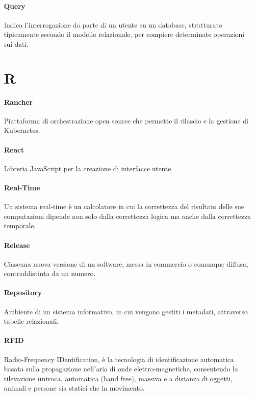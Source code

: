 \documentclass[]{article}
\begin{document}
	\paragraph*{Query}
	Indica l'interrogazione da parte di un utente su un database, strutturato tipicamente secondo il modello relazionale, per compiere determinate operazioni sui dati.
	
	\newpage
	
	\section*{R}
	
	\paragraph*{Rancher}
	Piattaforma di orchestrazione open source che permette il rilascio e la gestione di Kubernetes.
	
	\paragraph*{React}
	Libreria JavaScript per la creazione di interfacce utente.
	
	\paragraph*{Real-Time}
	Un sistema real-time è un calcolatore in cui la correttezza del risultato delle sue computazioni dipende non solo dalla correttezza logica ma anche dalla correttezza temporale.
	
	\paragraph*{Release}
	Ciascuna nuova versione di un software, messa in commercio o comunque diffusa, contraddistinta da un numero.
	
	\paragraph*{Repository}
	Ambiente di un sistema informativo, in cui vengono gestiti i metadati, attraverso tabelle relazionali.
	
	\paragraph*{RFID}
	Radio-Frequency IDentification, è la tecnologia di identificazione automatica basata sulla propagazione nell'aria di onde elettro-magnetiche, consentendo la rilevazione univoca, automatica (hand free), massiva e a distanza di oggetti, animali e persone sia statici che in movimento.
	
\end{document}
